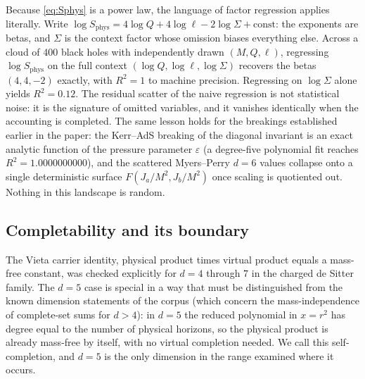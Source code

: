 Because \eqref{eq:Sphys} is a power law, the language of factor regression applies literally. Write $\log S_{\mathrm{phys}} = 4\log Q + 4\log\ell - 2\log\Sigma + \mathrm{const}$: the exponents are betas, and $\Sigma$ is the context factor whose omission biases everything else. Across a cloud of 400 black holes with independently drawn $(M,Q,\ell)$, regressing $\log S_{\mathrm{phys}}$ on the full context $(\log Q, \log\ell, \log\Sigma)$ recovers the betas $(4,4,-2)$ exactly, with $R^2 = 1$ to machine precision. Regressing on $\log\Sigma$ alone yields $R^2 = 0.12$. The residual scatter of the naive regression is not statistical noise: it is the signature of omitted variables, and it vanishes identically when the accounting is completed. The same lesson holds for the breakings established earlier in the paper: the Kerr--AdS breaking of the diagonal invariant is an exact analytic function of the pressure parameter $\varepsilon$ (a degree-five polynomial fit reaches $R^2 = 1.0000000000$), and the scattered Myers--Perry $d=6$ values collapse onto a single deterministic surface $F(J_a/M^2, J_b/M^2)$ once scaling is quotiented out. Nothing in this landscape is random.


\subsection{Completability and its boundary}

The Vieta carrier identity, physical product times virtual product equals a mass-free constant, was checked explicitly for $d=4$ through $7$ in the charged de Sitter family. The $d=5$ case is special in a way that must be distinguished from the known dimension statements of the corpus (which concern the mass-independence of complete-set sums for $d>4$): in $d=5$ the reduced polynomial in $x=r^2$ has degree equal to the number of physical horizons, so the physical product is already mass-free by itself, with no virtual completion needed. We call this self-completion, and $d=5$ is the only dimension in the range examined where it occurs.

